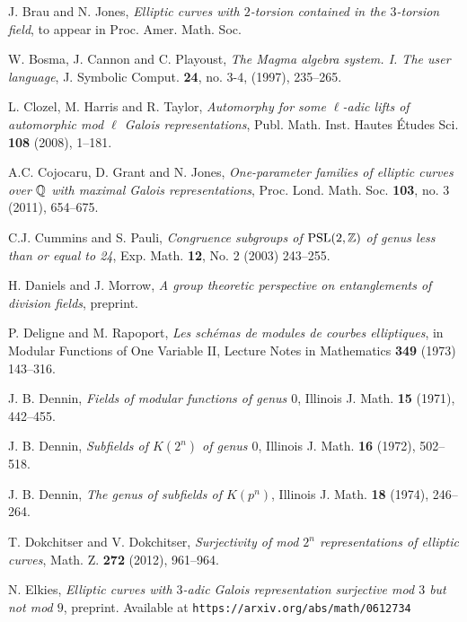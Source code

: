 \begin{thebibliography}{99}

 J. Brau and N. Jones, \emph{Elliptic curves with $2$-torsion contained in the $3$-torsion field}, to appear in Proc. Amer. Math. Soc.

 W. Bosma, J. Cannon and C. Playoust, \emph{The {M}agma algebra system. {I}. {T}he user language}, J. Symbolic Comput. \textbf{24}, no. 3-4, (1997), 235--265.

 L. Clozel, M. Harris and R. Taylor, \emph{Automorphy for some $\ell$-adic lifts of automorphic mod $\ell$ Galois representations}, Publ. Math. Inst. Hautes \'{E}tudes Sci. \textbf{108} (2008), 1--181.

 A.C. Cojocaru, D. Grant and N. Jones, \emph{One-parameter families of elliptic curves over $\mathbb{Q}$ with maximal Galois representations}, Proc. Lond. Math. Soc. \textbf{103}, no. 3 (2011), 654--675.

 C.J. Cummins and S. Pauli, \emph{Congruence subgroups of $\operatorname{PSL}(2,\mathbb{Z})$ of genus less than or equal to 24}, Exp. Math. \textbf{12}, No. 2 (2003) 243--255.

 H. Daniels and J. Morrow, \emph{A group theoretic perspective on entanglements of division fields}, preprint.

 P. Deligne and M. Rapoport, \emph{Les sch\'{e}mas de modules de courbes elliptiques}, in Modular Functions of One Variable II, Lecture Notes in Mathematics \textbf{349} (1973) 143--316.

 J. B. Dennin, \emph{Fields of modular functions of genus $0$}, Illinois J. Math. \textbf{15} (1971), 442--455.

 J. B. Dennin, \emph{Subfields of $K(2^n)$ of genus $0$}, Illinois J. Math. \textbf{16} (1972), 502--518.

 J. B. Dennin, \emph{The genus of subfields of $K(p^n)$}, Illinois J. Math. \textbf{18} (1974), 246--264.

 T. Dokchitser and V. Dokchitser, \emph{Surjectivity of mod $2^n$ representations of elliptic curves}, Math. Z. \textbf{272} (2012), 961--964.

 N. Elkies, \emph{Elliptic curves with $3$-adic Galois representation surjective mod $3$ but not mod $9$}, preprint.  Available at {\tt{https://arxiv.org/abs/math/0612734}}


\end{thebibliography}
